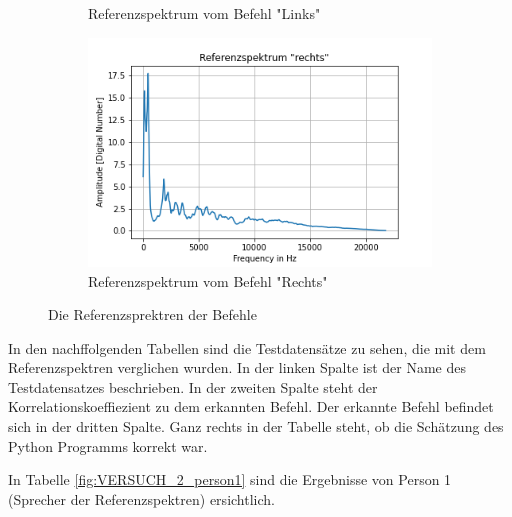 \documentclass[12pt, oneside, a4paper, \docLanguage]{report}
\begin{document}
\begin{figure}[H]
\begin{subfigure}{.5\textwidth}
  		\caption{Referenzspektrum vom Befehl "Links"}
  		\label{fig:VERSUCH_2_sub7}
	\end{subfigure}%
	\begin{subfigure}{.5\textwidth}
  		\centering
 		 \includegraphics[width=.95\linewidth]{media/ReferenzspektrumRechts.png}
  		\caption{Referenzspektrum vom Befehl "Rechts"}
  		\label{fig:VERSUCH_2_sub8}
	\end{subfigure}
	\caption{Die Referenzsprektren der Befehle}
	\label{fig:VERSUCH_2_referencsSpecs}
\end{figure}

In den nachffolgenden Tabellen sind die Testdatensätze zu sehen, die mit dem Referenzspektren verglichen wurden. In der linken Spalte ist der Name des Testdatensatzes beschrieben. In der zweiten Spalte steht der Korrelationskoeffiezient zu dem erkannten Befehl. Der erkannte Befehl befindet sich in der dritten Spalte. Ganz rechts in der Tabelle steht, ob die Schätzung des Python Programms korrekt war.

\newpage
In Tabelle \ref{fig:VERSUCH_2_person1} sind die Ergebnisse von Person 1 (Sprecher der Referenzspektren) ersichtlich.
\end{document}
